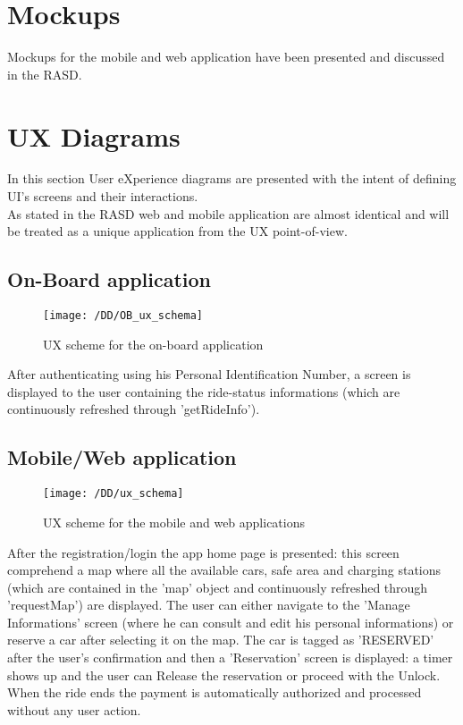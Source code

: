\section{Mockups}
	Mockups for the mobile and web application have been presented and discussed in the RASD. 

\section{UX Diagrams}
	In this section User eXperience diagrams are presented with the intent of defining UI's screens and their interactions.
	\\As stated in the RASD web and mobile application are almost identical and will be treated as a unique application from the UX point-of-view.

	\subsection{On-Board application}
		\begin{figure}[!ht]
		  \centering
		  \vspace{0.2cm}
		  \texttt{[image: /DD/OB\_ux\_schema]}\\
		  \vspace{0.4cm}
		  \caption{UX scheme for the on-board application} 
		  \label{fig:OB_ux_scheme} 
		\end{figure}

		After authenticating using his Personal Identification Number, a screen is displayed to the user containing the ride-status informations (which are continuously refreshed through 'getRideInfo').


	\subsection{Mobile/Web application}
		\begin{figure}[!ht]
		  \centering
		  \vspace{0.2cm}
		  \texttt{[image: /DD/ux\_schema]}\\
		  \vspace{0.4cm}
		  \caption{UX scheme for the mobile and web applications} 
		  \label{fig:ux_scheme} 
		\end{figure}

		After the registration/login the app home page is presented: this screen comprehend a map where all the available cars, safe area and charging stations (which are contained in the 'map' object and continuously refreshed through 'requestMap') are displayed. The user can either navigate to the 'Manage Informations' screen (where he can consult and edit his personal informations) or reserve a car after selecting it on the map. The car is tagged as 'RESERVED' after the user's confirmation and then a 'Reservation' screen is displayed: a timer shows up and the user can Release the reservation or proceed with the Unlock.
		\\When the ride ends the payment is automatically authorized and processed without any user action.
